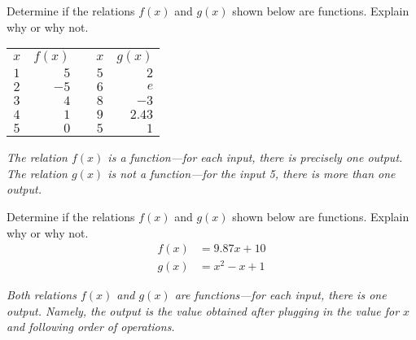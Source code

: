 \documentclass[11pt,letterpaper]{article}
\begin{document}
\newpage





 Determine if the relations $f(x)$ and $g(x)$ shown below are functions. Explain why or why not. 
	\begin{table}[!ht]
	\centering
	\begin{tabular}{c|rcc|r}
	$x$ & $f(x)$ & \hspace{1cm} & $x$ & $g(x)$ \\ \cline{1-2} \cline{4-5}
	$1$ & $5$ & & $5$ & $2$ \\
	$2$ & $-5$ & & $6$ & $e$ \\
	$3$ & $4$ & & $8$ & $-3$ \\
	$4$ & $1$ & & $9$ & $2.43$ \\
	$5$ & $0$ & & $5$ & $1$
	\end{tabular}
	\end{table} \pspace

{\itshape The relation $f(x)$ is a function---for each input, there is precisely one output. The relation $g(x)$ is not a function---for the input 5, there is more than one output.}





\newpage





 Determine if the relations $f(x)$ and $g(x)$ shown below are functions. Explain why or why not. 
	\[
	\begin{aligned}
	f(x)&= 9.87x + 10 \\[0.3cm]
	g(x)&= x^2 - x + 1
	\end{aligned}
	\] \pspace

{\itshape Both relations $f(x)$ and $g(x)$ are functions---for each input, there is one output. Namely, the output is the value obtained after plugging in the value for $x$ and following order of operations.}





\newpage
\end{document}

